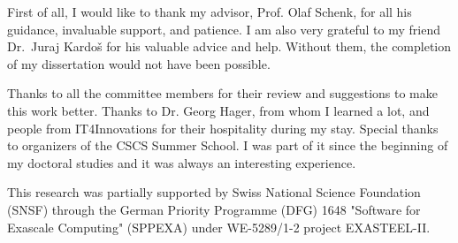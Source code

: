 \documentclass[]{usiinfthesis}
\begin{document}
\begin{acknowledgements}
First of all, I would like to thank my advisor, Prof. Olaf Schenk, for all his guidance, invaluable support, and patience. I am also very grateful to my friend Dr.~Juraj Kardoš for his valuable advice and help. Without them, the completion of my dissertation would not have been possible.

Thanks to all the committee members
for their review and suggestions to make this work better.
Thanks to Dr. Georg Hager,
from whom I learned a lot,
and
people from IT4Innovations for their hospitality during my stay.
Special thanks to organizers of the CSCS Summer School. I was part of it since the beginning of my doctoral studies and it was always an interesting experience.

This research was partially supported by Swiss National Science Foundation (SNSF) through  the German Priority Programme (DFG) 1648 "Software for Exascale Computing" (SPPEXA) under WE-5289/1-2 project EXASTEEL-II.
\end{acknowledgements}

\tableofcontents 

\mainmatter







\appendix %

\backmatter


%

%
%
%
%


\cleardoublepage
\end{document}

